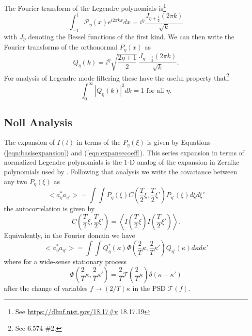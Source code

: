 \documentclass[10pt,preprint]{aastex631}
\begin{document}
The Fourier transform of the Legendre polynomials is\footnote{See \url{https://dlmf.nist.gov/18.17\#v} 18.17.19}
\begin{equation}
\int_{-1}^{1} \mathscr{P}_\eta(x) e^{i2\pi k x} dx  =  i^\eta \frac{J_{\eta+\frac{1}{2}}(2\pi k)}{\sqrt{k}}
\end{equation}
with $J_\eta$ denoting the Bessel functions of the first kind.  We can then write the Fourier transforms of the orthonormal $P_\eta(x)$ as 
\begin{equation}
Q_\eta(k) = i^\eta \sqrt{\frac{2\eta+1}{2}}\, \frac{J_{\eta+\frac{1}{2}}(2\pi k)}{\sqrt{k}}.
\end{equation}
For analysis of Legendre mode filtering these have the useful property that\footnote{See \citet{2007tisp.book.....G} 6.574 \#2.}
\begin{equation}
\int_{0}^\infty \left| Q_\eta(k) \right|^2 dk = 1 \mbox{ for all }\eta.
\end{equation}

\subsection{Noll Analysis}

The expansion of $I(t)$ in terms of the $P_\eta(\xi)$ is given by Equations (\ref{eqn:basisexpansion}) and (\ref{eqn:expansecoeff}).  This series expansion in terms of normalized Legendre polynomials is the 1-D analog of the expansion in Zernike polynomials used by \citet{1976JOSA...66..207N}.  Following that analysis we write the covariance between any two $P_\eta(\xi)$ as
\begin{equation}
<a_\eta^* a_{\eta'}> = \int \int P_\eta(\xi) C\left(\frac{T}{2}\xi, \frac{T}{2}\xi' \right) P_{\eta'}(\xi) d\xi d\xi' 
\end{equation}
the autocorrelation is given by
\begin{equation}
C\left(\frac{T}{2}\xi, \frac{T}{2}\xi' \right) = \left<I\left(\frac{T}{2}\xi\right)I\left(\frac{T}{2}\xi'\right) \right>.
\end{equation}
Equivalently, in the Fourier domain we have
\begin{equation}
<a_\eta^* a_{\eta'}> = \int \int Q_\eta^*(\kappa) \Phi \left(\frac{2}{T}\kappa, \frac{2}{T}\kappa' \right) Q_{\eta'}(\kappa) d\kappa d\kappa' 
\end{equation}
where for a wide-sense stationary process
\begin{equation}
\Phi \left(\frac{2}{T}\kappa, \frac{2}{T}\kappa' \right) = \frac{2}{T} \mathcal{T}\left(\frac{2}{T}\kappa \right) \delta(\kappa-\kappa')
\end{equation}
after the change of variables $f \rightarrow (2/T)\kappa$ in the PSD $\mathcal{T}(f)$.
\end{document}
